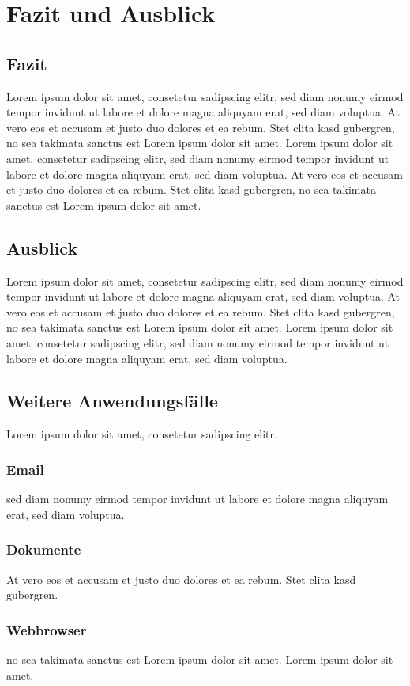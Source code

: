 \chapter{Fazit und Ausblick}
\label{chap:conclusion_and_outlook}

\section{Fazit}
Lorem ipsum dolor sit amet, consetetur sadipscing elitr,
sed diam nonumy eirmod tempor invidunt ut labore et dolore magna
aliquyam erat, sed diam voluptua.
At vero eos et accusam et justo duo dolores et ea rebum. Stet clita kasd gubergren,
no sea takimata sanctus est Lorem ipsum dolor sit amet. Lorem ipsum dolor sit amet,
consetetur sadipscing elitr, sed diam nonumy eirmod tempor invidunt ut labore et
dolore magna aliquyam erat, sed diam voluptua.
At vero eos et accusam et justo duo dolores et ea rebum.
Stet clita kasd gubergren, no sea takimata sanctus est Lorem ipsum dolor sit amet.

\section{Ausblick}
Lorem ipsum dolor sit amet, consetetur sadipscing elitr,
sed diam nonumy eirmod tempor invidunt ut labore et dolore magna
aliquyam erat, sed diam voluptua.
At vero eos et accusam et justo duo dolores et ea rebum. Stet clita kasd gubergren,
no sea takimata sanctus est Lorem ipsum dolor sit amet. Lorem ipsum dolor sit amet,
consetetur sadipscing elitr, sed diam nonumy eirmod tempor invidunt ut labore et
dolore magna aliquyam erat, sed diam voluptua.


\section{Weitere Anwendungsfälle}
Lorem ipsum dolor sit amet, consetetur sadipscing elitr.

\subsection{Email}
sed diam nonumy eirmod tempor invidunt ut labore et dolore magna
aliquyam erat, sed diam voluptua.

\subsection{Dokumente}
At vero eos et accusam et justo duo dolores et ea rebum. Stet clita kasd gubergren.

\subsection{Webbrowser}
no sea takimata sanctus est Lorem ipsum dolor sit amet. Lorem ipsum dolor sit amet.
